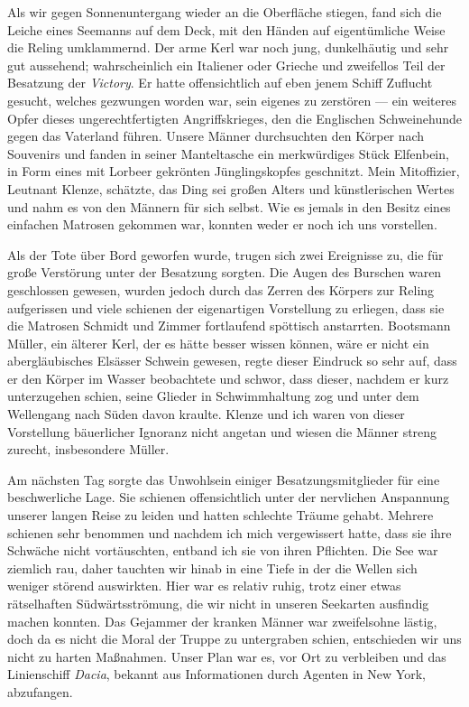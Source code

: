 \documentclass[a4paper]{memoir}
\begin{document}
Als wir gegen Sonnenuntergang wieder an die Oberfläche stiegen, fand sich die Leiche eines Seemanns auf dem Deck, mit den Händen auf eigentümliche Weise die Reling umklammernd. Der arme Kerl war noch jung, dunkelhäutig und sehr gut aussehend; wahrscheinlich ein Italiener oder Grieche und zweifellos Teil der Besatzung der \textit{Victory}. Er hatte offensichtlich auf eben jenem Schiff Zuflucht gesucht, welches gezwungen worden war, sein eigenes zu zerstören --- ein weiteres Opfer dieses ungerechtfertigten Angriffskrieges, den die Englischen Schweinehunde gegen das Vaterland führen. Unsere Männer durchsuchten den Körper nach Souvenirs und fanden in seiner Manteltasche ein merkwürdiges Stück Elfenbein, in Form eines mit Lorbeer gekrönten Jünglingskopfes geschnitzt.
Mein Mitoffizier, Leutnant Klenze, schätzte, das Ding sei großen Alters und künstlerischen Wertes und nahm es von den Männern für sich selbst. Wie es jemals in den Besitz eines einfachen Matrosen gekommen war, konnten weder er noch ich uns vorstellen.

Als der Tote über Bord geworfen wurde, trugen sich zwei Ereignisse zu, die für große Verstörung unter der Besatzung sorgten. Die Augen des Burschen waren geschlossen gewesen, wurden jedoch durch das Zerren des Körpers zur Reling aufgerissen und viele schienen der eigenartigen Vorstellung zu erliegen, dass sie die Matrosen Schmidt und Zimmer fortlaufend spöttisch anstarrten. Bootsmann Müller, ein älterer Kerl, der es hätte besser wissen können, wäre er nicht ein abergläubisches Elsässer Schwein gewesen, regte dieser Eindruck so sehr auf, dass er den Körper im Wasser beobachtete und schwor, dass dieser, nachdem er kurz unterzugehen schien, seine Glieder in Schwimmhaltung zog und unter dem Wellengang nach Süden davon kraulte. Klenze und ich waren von dieser Vorstellung bäuerlicher Ignoranz nicht angetan und wiesen die Männer streng zurecht, insbesondere Müller.

Am nächsten Tag sorgte das Unwohlsein einiger Besatzungsmitglieder für eine beschwerliche Lage. Sie schienen offensichtlich unter der nervlichen Anspannung unserer langen Reise zu leiden und hatten schlechte Träume gehabt. Mehrere schienen sehr benommen und nachdem ich mich vergewissert hatte, dass sie ihre Schwäche nicht vortäuschten, entband ich sie von ihren Pflichten.
Die See war ziemlich rau, daher tauchten wir hinab in eine Tiefe in der die Wellen sich weniger störend auswirkten. Hier war es relativ ruhig, trotz einer etwas rätselhaften Südwärtsströmung, die wir nicht in unseren Seekarten ausfindig machen konnten. Das Gejammer der kranken Männer war zweifelsohne lästig, doch da es nicht die Moral der Truppe zu untergraben schien, entschieden wir uns nicht zu harten Maßnahmen. Unser Plan war es, vor Ort zu verbleiben und das Linienschiff \textit{Dacia}, bekannt aus Informationen durch Agenten in New York, abzufangen.
\end{document}
